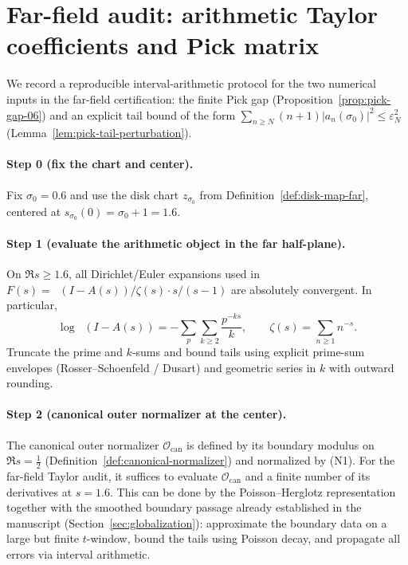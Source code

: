 \documentclass[11pt]{article}
\theoremstyle{definition}
\theoremstyle{remark}
\theoremstyle{definition}
\DeclareMathOperator{\dettwo}{det_2}
\begin{document}
\section{Far-field audit: arithmetic Taylor coefficients and Pick matrix}\label{app:pick-audit}
We record a reproducible interval-arithmetic protocol for the two numerical inputs in the far-field certification:
the finite Pick gap (Proposition~\ref{prop:pick-gap-06}) and an explicit tail bound of the form
\(\sum_{n\ge N}(n+1)|a_n(\sigma_0)|^2\le \varepsilon_N^2\) (Lemma~\ref{lem:pick-tail-perturbation}).

\paragraph{Step 0 (fix the chart and center).}
Fix $\sigma_0=0.6$ and use the disk chart $z_{\sigma_0}$ from Definition~\ref{def:disk-map-far}, centered at
$s_{\sigma_0}(0)=\sigma_0+1=1.6$.

\paragraph{Step 1 (evaluate the arithmetic object in the far half-plane).}
On $\Re s\ge 1.6$, all Dirichlet/Euler expansions used in $F(s)=\dettwo(I-A(s))/\zeta(s)\cdot s/(s-1)$ are absolutely convergent.
In particular,
\[
  \log\dettwo(I-A(s))=-\sum_{p}\sum_{k\ge 2}\frac{p^{-ks}}{k},
  \qquad
  \zeta(s)=\sum_{n\ge 1}n^{-s}.
\]
Truncate the prime and $k$-sums and bound tails using explicit prime-sum envelopes (Rosser--Schoenfeld / Dusart) and geometric series in $k$ with outward rounding.

\paragraph{Step 2 (canonical outer normalizer at the center).}
The canonical outer normalizer $\mathcal O_{\mathrm{can}}$ is defined by its boundary modulus on $\Re s=\tfrac12$ (Definition~\ref{def:canonical-normalizer}) and normalized by (N1).
For the far-field Taylor audit, it suffices to evaluate $\mathcal O_{\mathrm{can}}$ and a finite number of its derivatives at $s=1.6$.
This can be done by the Poisson--Herglotz representation together with the smoothed boundary passage already established in the manuscript (Section~\ref{sec:globalization}): approximate the boundary data on a large but finite $t$-window, bound the tails using Poisson decay, and propagate all errors via interval arithmetic.
\end{document}
